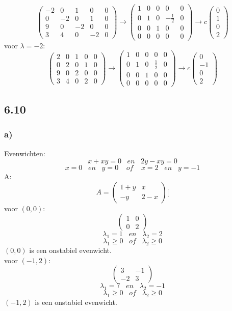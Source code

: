 \documentclass[11pt]{article}
\begin{document}
\[
\left(
\begin{array}{cccc|c}
-2 & 0 & 1 & 0 & 0\\
0 & -2 & 0 & 1 & 0\\
9 & 0 & -2 & 0 & 0\\
3 & 4 & 0 & -2 & 0
\end{array}
\right)
\longrightarrow
\left(
\begin{array}{cccc|c}
1 & 0 & 0 & 0 & 0\\
0 & 1 & 0 & -\frac{1}{2} & 0\\
0 & 0 & 1 & 0 & 0\\
0 & 0 & 0 & 0 & 0
\end{array}
\right)
\longrightarrow
c
\begin{pmatrix}
0\\1\\0\\2
\end{pmatrix}
\]
voor $\lambda=-2$:
\[
\left(
\begin{array}{cccc|c}
2 & 0 & 1 & 0 & 0\\
0 & 2 & 0 & 1 & 0\\
9 & 0 & 2 & 0 & 0\\
3 & 4 & 0 & 2 & 0
\end{array}
\right)
\longrightarrow
\left(
\begin{array}{cccc|c}
1 & 0 & 0 & 0 & 0\\
0 & 1 & 0 & \frac{1}{2} & 0\\
0 & 0 & 1 & 0 & 0\\
0 & 0 & 0 & 0 & 0
\end{array}
\right)
\longrightarrow
c
\begin{pmatrix}
0\\-1\\0\\2
\end{pmatrix}
\]

\subsection*{6.10}
\subsubsection*{a)}
Evenwichten:
\[
x+xy=0 \;\;\;en\;\;\; 2y-xy=0
\]
\[
x=0 \;\;\;en\;\;\; y=0
\;\;\;\;of\;\;\;\;
x=2 \;\;\;en\;\;\; y=-1
\]
A:
\[
A=
\begin{pmatrix}
1+y & x \\
-y & 2-x
\end{pmatrix}[
\]
voor $(0,0)$:
\[
\begin{pmatrix}
1 & 0 \\
0 & 2
\end{pmatrix}
\]
\[
\lambda_1 = 1
\;\;\;en\;\;\;
\lambda_2 = 2
\]
\[
\lambda_1 \ge 0 \;\;\;of\;\;\; \lambda_2 \ge 0
\]
$(0,0)$ is een onstabiel evenwicht.\\
voor $(-1,2)$:
\[
\begin{pmatrix}
3 & -1 \\
-2 & 3
\end{pmatrix}
\]
\[
\lambda_1 = 7
\;\;\;en\;\;\;
\lambda_2 = -1
\]
\[
\lambda_1 \ge 0 \;\;\;of\;\;\; \lambda_2 \ge 0
\]
$(-1,2)$ is een onstabiel evenwicht.
\end{document}

